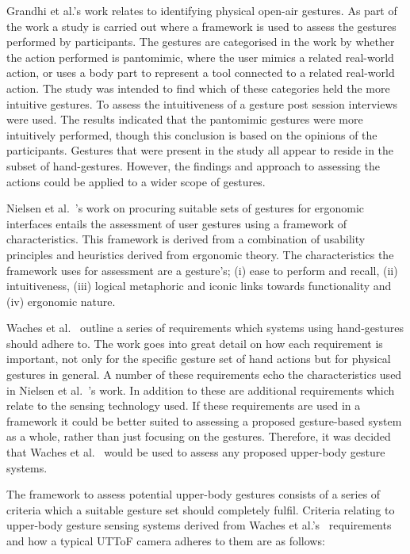 \documentclass[manuscript, review, screen]{acmart}
\begin{document}
Grandhi et al.'s \citeyearpar{Grandhi2011} work relates to identifying physical open-air gestures.
As part of the work a study is carried out where a framework is used to assess the gestures performed by participants.
The gestures are categorised in the work by whether the action performed is pantomimic, where the user mimics a related real-world action, or uses a body part to represent a tool connected to a related real-world action.
The study was intended to find which of these categories held the more intuitive gestures.
To assess the intuitiveness of a gesture post session interviews were used.
The results indicated that the pantomimic gestures were more intuitively performed, though this conclusion is based on the opinions of the participants.
Gestures that were present in the study all appear to reside in the subset of hand-gestures.
However, the findings and approach to assessing the actions could be applied to a wider scope of gestures.

Nielsen et al.~\citeyearpar{Nielsen2004}'s work on procuring suitable sets of gestures for ergonomic interfaces entails the assessment of user gestures using a framework of characteristics.
This framework is derived from a combination of usability principles and heuristics derived from ergonomic theory.
The characteristics the framework uses for assessment are a gesture's; (i) ease to perform and recall, (ii) intuitiveness, (iii) logical metaphoric and iconic links towards functionality and (iv) ergonomic nature.

Waches et al.~\citeyearpar{Wachs2011} outline a series of requirements which systems using hand-gestures should adhere to.
The work goes into great detail on how each requirement is important, not only for the specific gesture set of hand actions but for physical gestures in general.
A number of these requirements echo the characteristics used in Nielsen et al.~\citeyearpar{Nielsen2004}'s work.
In addition to these are additional requirements which relate to the sensing technology used.
If these requirements are used in a framework it could be better suited to assessing a proposed gesture-based system as a whole, rather than just focusing on the gestures.
Therefore, it was decided that Waches et al.~\citeyearpar{Wachs2011} would be used to assess any proposed upper-body gesture systems.

The framework to assess potential upper-body gestures consists of a series of criteria which a suitable gesture set should completely fulfil.
Criteria relating to upper-body gesture sensing systems derived from Waches et al.'s~\citeyearpar{Wachs2011} requirements and how a typical \ac{UTToF} camera adheres to them are as follows:
\end{document}
